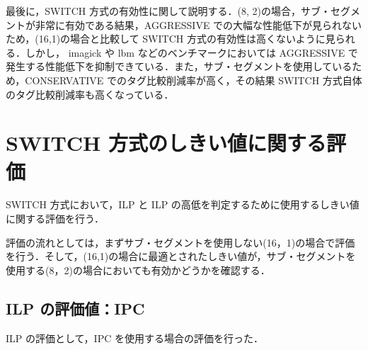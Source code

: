 最後に，SWITCH 方式の有効性に関して説明する．(8, 2)の場合，サブ・セグメントが非常に有効である結果，AGGRESSIVE での大幅な性能低下が見られないため，(16,1)の場合と比較して SWITCH 方式の有効性は高くないように見られる．しかし， imagick や lbm などのベンチマークにおいては AGGRESSIVE で発生する性能低下を抑制できている．また，サブ・セグメントを使用しているため，CONSERVATIVE でのタグ比較削減率が高く，その結果 SWITCH 方式自体のタグ比較削減率も高くなっている．

\section{SWITCH 方式のしきい値に関する評価}
SWITCH 方式において，ILP と ILP の高低を判定するために使用するしきい値に関する評価を行う．

評価の流れとしては，まずサブ・セグメントを使用しない(16，1)の場合で評価を行う．そして，(16,1)の場合に最適とされたしきい値が，サブ・セグメントを使用する(8，2)の場合においても有効かどうかを確認する．

\subsection{ILP の評価値：IPC}
ILP の評価として，IPC を使用する場合の評価を行った．